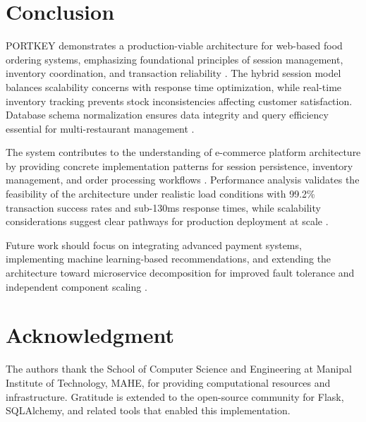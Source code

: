 \documentclass[conference]{IEEEtran}
\begin{document}
\section{Conclusion}

PORTKEY demonstrates a production-viable architecture for web-based food ordering systems, emphasizing foundational principles of session management, inventory coordination, and transaction reliability \cite{b58, b61, b67}. The hybrid session model balances scalability concerns with response time optimization, while real-time inventory tracking prevents stock inconsistencies affecting customer satisfaction. Database schema normalization ensures data integrity and query efficiency essential for multi-restaurant management \cite{b5, b28, b64}.

The system contributes to the understanding of e-commerce platform architecture by providing concrete implementation patterns for session persistence, inventory management, and order processing workflows \cite{b53, b55, b90}. Performance analysis validates the feasibility of the architecture under realistic load conditions with 99.2\% transaction success rates and sub-130ms response times, while scalability considerations suggest clear pathways for production deployment at scale \cite{b82, b84}.

Future work should focus on integrating advanced payment systems, implementing machine learning-based recommendations, and extending the architecture toward microservice decomposition for improved fault tolerance and independent component scaling \cite{b77, b78, b87}.

\section*{Acknowledgment}

The authors thank the School of Computer Science and Engineering at Manipal Institute of Technology, MAHE, for providing computational resources and infrastructure. Gratitude is extended to the open-source community for Flask, SQLAlchemy, and related tools that enabled this implementation.
\end{document}
